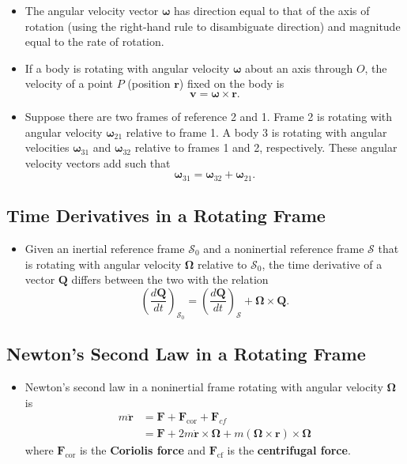 \documentclass{article}
\renewcommand{\vec}[1]{\boldsymbol{\mathbf{#1}}}
\newcommand{\dvec}[1]{\dot{\vec{#1}}}
\newcommand{\ddvec}[1]{\ddot{\vec{#1}}}
\begin{document}
\begin{itemize}
  \item The angular velocity vector $\vec{\omega}$ has direction equal to that of the axis of rotation (using the right-hand rule to disambiguate direction) and magnitude equal to the rate of rotation.

  \item If a body is rotating with angular velocity $\vec{\omega}$ about an axis through $O$, the velocity of a point $P$ (position $\vec{r}$) fixed on the body is \[\vec{v} = \vec{\omega} \times \vec{r}.\]

  \item Suppose there are two frames of reference 2 and 1. Frame 2 is rotating with angular velocity $\vec{\omega}_{21}$ relative to frame 1. A body 3 is rotating with angular velocities $\vec{\omega}_{31}$ and $\vec{\omega}_{32}$ relative to frames 1 and 2, respectively. These angular velocity vectors add such that \[\vec{\omega}_{31} = \vec{\omega}_{32} + \vec{\omega}_{21}.\]
\end{itemize}

\subsection{Time Derivatives in a Rotating Frame}

\begin{itemize}
  \item Given an inertial reference frame $\mathcal{S}_0$ and a noninertial reference frame $\mathcal{S}$ that is rotating with angular velocity $\vec{\Omega}$ relative to $\mathcal{S}_0$, the time derivative of a vector $\vec{Q}$ differs between the two with the relation \[\left( \frac{d \vec{Q}}{d t} \right)_{\mathcal{S}_0} = \left( \frac{d \vec{Q}}{d t} \right)_\mathcal{S} + \vec{\Omega} \times \vec{Q}.\]
\end{itemize}

\subsection{Newton's Second Law in a Rotating Frame}

\begin{itemize}
  \item Newton's second law in a noninertial frame rotating with angular velocity $\vec{\Omega}$ is \begin{align*}
          m \ddvec{r} & = \vec{F} + \vec{F}_\text{cor} + \vec{F}_{cf}                                                      \\
                      & = \vec{F} + 2 m \dvec{r} \times \vec{\Omega} + m (\vec{\Omega} \times \vec{r}) \times \vec{\Omega}
        \end{align*} where $\vec{F}_\text{cor}$ is the \textbf{Coriolis force} and $\vec{F}_\text{cf}$ is the \textbf{centrifugal force}.
\end{itemize}
\end{document}
